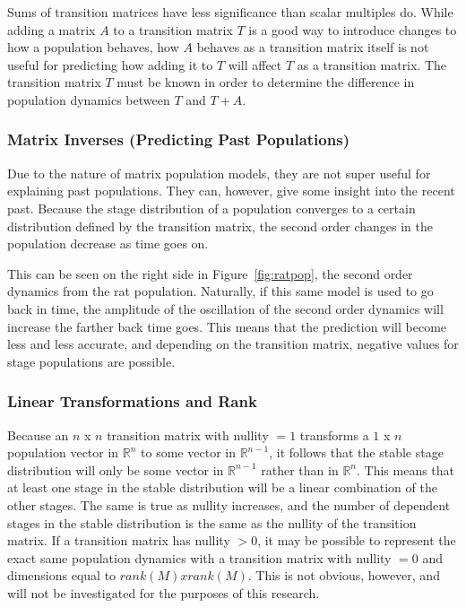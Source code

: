 \documentclass{article}
\begin{document}
    \hspace{\parindent}Sums of transition matrices have less significance than scalar multiples do.
    While adding a matrix $A$ to a transition matrix $T$ is a good way to introduce changes to how a population behaves, how $A$ behaves as a transition matrix itself is not useful for predicting how adding it to $T$ will affect $T$ as a transition matrix.
    The transition matrix $T$ must be known in order to determine the difference in population dynamics between $T$ and $T+A$.

    \subsubsection{Matrix Inverses (Predicting Past Populations)}

    \hspace{\parindent}Due to the nature of matrix population models, they are not super useful for explaining past populations.
    They can, however, give some insight into the recent past.
    Because the stage distribution of a population converges to a certain distribution defined by the transition matrix, the second order changes in the population decrease as time goes on.

    This can be seen on the right side in Figure~\ref{fig:ratpop}, the second order dynamics from the rat population.
    Naturally, if this same model is used to go back in time, the amplitude of the oscillation of the second order dynamics will increase the farther back time goes.
    This means that the prediction will become less and less accurate, and depending on the transition matrix, negative values for stage populations are possible.

    \subsubsection{Linear Transformations and Rank}\label{subsubsec:linear-transformations-and-rank}

    \hspace{\parindent}Because an $n$ x $n$ transition matrix with nullity $= 1$ transforms a $1$ x $n$ population vector in $\mathbb{R}^n$ to some vector in $\mathbb{R}^{n-1}$, it follows that the stable stage distribution will only be some vector in $\mathbb{R}^{n-1}$ rather than in $\mathbb{R}^n$.
    This means that at least one stage in the stable distribution will be a linear combination of the other stages.
    The same is true as nullity increases, and the number of dependent stages in the stable distribution is the same as the nullity of the transition matrix.
    If a transition matrix has nullity $> 0$, it may be possible to represent the exact same population dynamics with a transition matrix with nullity $= 0$ and dimensions equal to $rank(M) x rank(M)$.
    This is not obvious, however, and will not be investigated for the purposes of this research.
\end{document}
